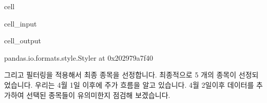 \documentclass[letterpaper,10pt,english]{jupyterBook}
\begin{document}
\begin{sphinxuseclass}{cell}\begin{sphinxVerbatimInput}

\begin{sphinxuseclass}{cell_input}
\begin{sphinxVerbatim}[commandchars=\\\{\}]
 
\end{sphinxVerbatim}

\end{sphinxuseclass}\end{sphinxVerbatimInput}
\begin{sphinxVerbatimOutput}

\begin{sphinxuseclass}{cell_output}
\begin{sphinxVerbatim}[commandchars=\\\{\}]
\PYGZlt{}pandas.io.formats.style.Styler at 0x202979a7f40\PYGZgt{}
\end{sphinxVerbatim}

\end{sphinxuseclass}\end{sphinxVerbatimOutput}

\end{sphinxuseclass}
\sphinxAtStartPar
 그리고 필터링을 적용해서 최종 종목을 선정합니다. 최종적으로 5 개의 종목이 선정되었습니다. 우리는 4월 1일 이후에 주가 흐름을 알고 있습니다. 4월 2일이후 데이터를 추가하여 선택된 종목들이 유의미한지 점검해 보겠습니다.
\end{document}
